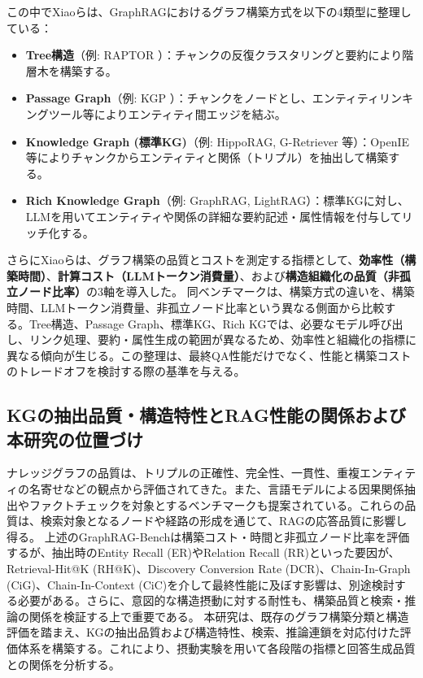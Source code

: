 \documentclass[a4j,dvipdfmx]{jsarticle}
\begin{document}
この中でXiaoらは、GraphRAGにおけるグラフ構築方式を以下の4類型に整理している：
\begin{itemize}
    \item \textbf{Tree構造}（例: RAPTOR \cite{sarthi2024raptor}）：チャンクの反復クラスタリングと要約により階層木を構築する。
    \item \textbf{Passage Graph}（例: KGP \cite{wang2024kgp}）：チャンクをノードとし、エンティティリンキングツール等によりエンティティ間エッジを結ぶ。
    \item \textbf{Knowledge Graph (標準KG)}（例: HippoRAG, G-Retriever \cite{he2024gretriever}等）：OpenIE等によりチャンクからエンティティと関係（トリプル）を抽出して構築する。
    \item \textbf{Rich Knowledge Graph}（例: GraphRAG, LightRAG）：標準KGに対し、LLMを用いてエンティティや関係の詳細な要約記述・属性情報を付与してリッチ化する。
\end{itemize}
さらにXiaoらは、グラフ構築の品質とコストを測定する指標として、\textbf{効率性（構築時間）}、\textbf{計算コスト（LLMトークン消費量）}、および\textbf{構造組織化の品質（非孤立ノード比率）}の3軸を導入した。
同ベンチマークは、構築方式の違いを、構築時間、LLMトークン消費量、非孤立ノード比率という異なる側面から比較する。Tree構造、Passage Graph、標準KG、Rich KGでは、必要なモデル呼び出し、リンク処理、要約・属性生成の範囲が異なるため、効率性と組織化の指標に異なる傾向が生じる。この整理は、最終QA性能だけでなく、性能と構築コストのトレードオフを検討する際の基準を与える。

\subsection{KGの抽出品質・構造特性とRAG性能の関係および本研究の位置づけ}
ナレッジグラフの品質は、トリプルの正確性、完全性、一貫性、重複エンティティの名寄せなどの観点から評価されてきた。また、言語モデルによる因果関係抽出やファクトチェックを対象とするベンチマークも提案されている\cite{ugai2025,trivedi2022musique}。これらの品質は、検索対象となるノードや経路の形成を通じて、RAGの応答品質に影響し得る。
上述のGraphRAG-Benchは構築コスト・時間と非孤立ノード比率を評価するが、抽出時のEntity Recall (ER)やRelation Recall (RR)といった要因が、Retrieval-Hit@K (RH@K)、Discovery Conversion Rate (DCR)、Chain-In-Graph (CiG)、Chain-In-Context (CiC)を介して最終性能に及ぼす影響は、別途検討する必要がある。さらに、意図的な構造摂動に対する耐性も、構築品質と検索・推論の関係を検証する上で重要である。
本研究は、既存のグラフ構築分類と構造評価を踏まえ、KGの抽出品質および構造特性、検索、推論連鎖を対応付けた評価体系を構築する。これにより、摂動実験を用いて各段階の指標と回答生成品質との関係を分析する。
\end{document}
